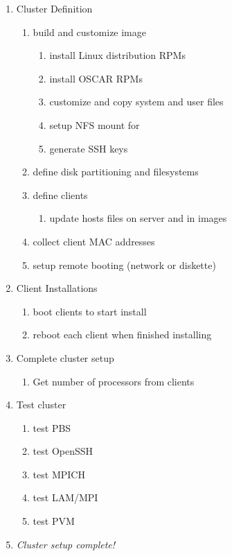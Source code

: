 \begin{enumerate}
\item Cluster Definition
  \begin{enumerate}
  \item build and customize image
    \begin{enumerate}
    \item install Linux distribution RPMs
    \item install OSCAR RPMs
    \item customize and copy system and user files
    \item setup NFS mount for 
    \item generate SSH keys
    \end{enumerate}
  \item define disk partitioning and filesystems
  \item define clients
    \begin{enumerate}
    \item update hosts files on server and in images
    \end{enumerate}
  \item collect client MAC addresses
  \item setup remote booting (network or diskette)
  \end{enumerate}
  
\item Client Installations
  \begin{enumerate}
  \item boot clients to start install
  \item reboot each client when finished installing
  \end{enumerate}
\item Complete cluster setup
  \begin{enumerate}
  \item Get number of processors from clients
  \end{enumerate}
\item Test cluster
  \begin{enumerate}
  \item test PBS
  \item test OpenSSH
  \item test MPICH
  \item test LAM/MPI
  \item test PVM
  \end{enumerate}
\item \emph{Cluster setup complete!}
\end{enumerate}
